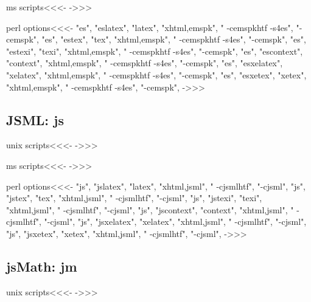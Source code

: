 \documentclass{article}
\begin{document}
\<ms scripts\><<<-
->>>


\<perl options\><<<-
 "es", "eslatex",   "latex",   "xhtml,emspk", " -cemspkhtf -s4es",  "-cemspk",
 "es", "estex",     "tex",     "xhtml,emspk", " -cemspkhtf -s4es",  "-cemspk",
 "es", "estexi",    "texi",    "xhtml,emspk", " -cemspkhtf -s4es",  "-cemspk",
 "es", "escontext", "context", "xhtml,emspk", " -cemspkhtf -s4es",  "-cemspk",
 "es", "esxelatex",   "xelatex",   "xhtml,emspk", " -cemspkhtf -s4es",  "-cemspk",
 "es", "esxetex",     "xetex",     "xhtml,emspk", " -cemspkhtf -s4es",  "-cemspk",
->>>





\subsection{JSML: js}

\<unix scripts\><<<-
->>>

\<ms scripts\><<<-
->>>


\<perl options\><<<-
 "js", "jslatex",   "latex",   "xhtml,jsml", " -cjsmlhtf",  "-cjsml",
 "js", "jstex",     "tex",     "xhtml,jsml", " -cjsmlhtf",  "-cjsml",
 "js", "jstexi",    "texi",    "xhtml,jsml", " -cjsmlhtf",  "-cjsml",
 "js", "jscontext", "context", "xhtml,jsml", " -cjsmlhtf",  "-cjsml",
 "js", "jsxelatex",   "xelatex",   "xhtml,jsml", " -cjsmlhtf",  "-cjsml",
 "js", "jsxetex",     "xetex",     "xhtml,jsml", " -cjsmlhtf",  "-cjsml",
->>>





\subsection{jsMath: jm}

\<unix scripts\><<<-
->>>
\end{document}

